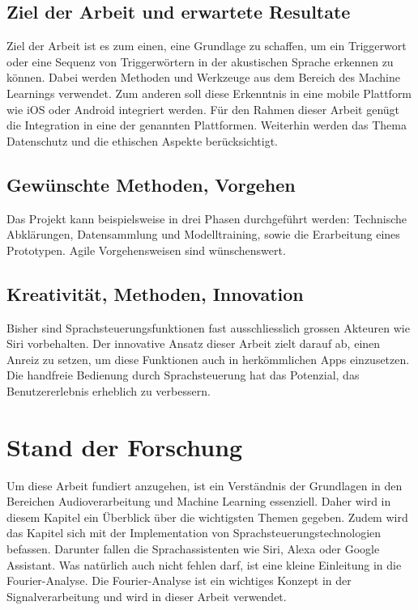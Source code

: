 \documentclass[11pt,a4paper]{article}
\begin{document}
\subsection*{Ziel der Arbeit und erwartete Resultate}
Ziel der Arbeit ist es zum einen, eine Grundlage zu schaffen, um ein Triggerwort oder eine
Sequenz von Triggerwörtern in der akustischen Sprache erkennen zu können. Dabei werden
Methoden und Werkzeuge aus dem Bereich des Machine Learnings verwendet. Zum anderen soll
diese Erkenntnis in eine mobile Plattform wie iOS oder Android integriert werden. Für den
Rahmen dieser Arbeit genügt die Integration in eine der genannten Plattformen. Weiterhin
werden das Thema Datenschutz und die ethischen Aspekte berücksichtigt.

\subsection*{Gewünschte Methoden, Vorgehen}
Das Projekt kann beispielsweise in drei Phasen durchgeführt werden: Technische Abklärungen,
Datensammlung und Modelltraining, sowie die Erarbeitung eines Prototypen. Agile
Vorgehensweisen sind wünschenswert.

\subsection*{Kreativität, Methoden, Innovation}
Bisher sind Sprachsteuerungsfunktionen fast ausschliesslich grossen Akteuren wie Siri
vorbehalten. Der innovative Ansatz dieser Arbeit zielt darauf ab, einen Anreiz zu setzen,
um diese Funktionen auch in herkömmlichen Apps einzusetzen. Die handfreie Bedienung durch
Sprachsteuerung hat das Potenzial, das Benutzererlebnis erheblich zu verbessern.



\newpage
\section{Stand der Forschung}
Um diese Arbeit fundiert anzugehen, ist ein Verständnis der Grundlagen in den Bereichen 
Audioverarbeitung und Machine Learning essenziell. Daher wird in diesem Kapitel ein Überblick 
über die wichtigsten Themen gegeben. Zudem wird das Kapitel sich mit der Implementation von 
Sprachsteuerungstechnologien befassen. Darunter fallen die Sprachassistenten wie Siri, Alexa oder 
Google Assistant. Was natürlich auch nicht fehlen darf, ist eine kleine Einleitung in die 
Fourier-Analyse. Die Fourier-Analyse ist ein wichtiges Konzept in der 
Signalverarbeitung und wird in dieser Arbeit verwendet.
\end{document}
